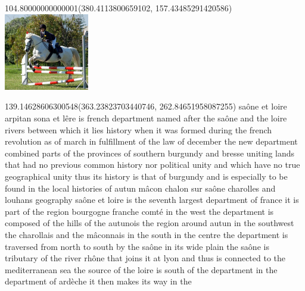 \documentclass[10pt]{article}
\begin{document}
    \begin{textblock}{104.80000000000001}(380.4113800659102, 157.43485291420586)
    \noindent
    \includegraphics[width=104.80000000000001pt,height=95.41166666666668pt]{data/Images/2007_000783.jpg}
    \end{textblock}
    
    \begin{textblock}{139.14628606300548}(363.23823703440746, 262.84651958087255)
        \color{black}
        saône et loire arpitan sona et lêre is french department named after the saône and the loire rivers between which it lies history when it was formed during the french revolution as of march in fulfillment of the law of december the new department combined parts of the provinces of southern burgundy and bresse uniting lands that had no previous common history nor political unity and which have no true geographical unity thus its history is that of burgundy and is especially to be found in the local histories of autun mâcon chalon sur saône charolles and louhans geography saône et loire is the seventh largest department of france it is part of the region bourgogne franche comté in the west the department is composed of the hills of the autunois the region around autun in the southwest the charollais and the mâconnais in the south in the centre the department is traversed from north to south by the saône in its wide plain the saône is tributary of the river rhône that joins it at lyon and thus is connected to the mediterranean sea the source of the loire is south of the department in the department of ardèche it then makes its way in the 
    \end{textblock}
    
\end{document}
